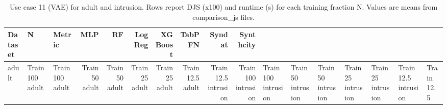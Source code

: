 \begin{table}[ht]
\centering
\scriptsize
\setlength{\tabcolsep}{2.5pt}
\caption{Use case 11 (VAE) for adult and intrusion. Rows report DJS (x100) and runtime (s) for each training fraction N. Values are means from comparison_js files.}
\label{tab:uc11_vae_adult_intrusion_with_n}
\begin{tabular}{lllrrrrrrr}
\toprule
Dataset & N & Metric & MLP & RF & LogReg & XGBoost & TabPFN & Syndat & Synthcity \\
\midrule
adult & Train 100%
adult & Train 100%
adult & Train 50%
adult & Train 50%
adult & Train 25%
adult & Train 25%
adult & Train 12.5%
adult & Train 12.5%
intrusion & Train 100%
intrusion & Train 100%
intrusion & Train 50%
intrusion & Train 50%
intrusion & Train 25%
intrusion & Train 25%
intrusion & Train 12.5%
intrusion & Train 12.5%
\bottomrule
\end{tabular}
\end{table}